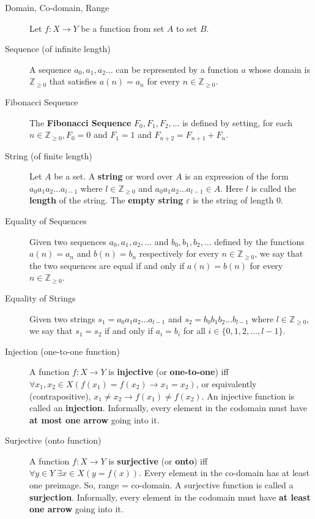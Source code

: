 \documentclass{article}
\begin{document}
\begin{description}
    \item[Domain, Co-domain, Range]Let $f:X\to Y$ be a function from set $A$ to set $B$. 
    \item[Sequence (of infinite length)] A sequence $a_{0}, a_{1}, a_{2} \dots$ can be represented by a function $a$ whose domain is $\mathbb{Z}_{\geq 0}$ that satisfies $a(n)=a_{n}$ for every $n\in \mathbb{Z}_{\geq 0}$.
    \item[Fibonacci Sequence] The \textbf{Fibonacci Sequence} $F_{0}, F_{1}, F_{2}, \dots$ is defined by setting, for each $n \in \mathbb{Z}_{\geq 0}, F_{0}=0$ and $F_{1}=1$ and $F_{n+2}=F_{n+1}+F_{n}$.
    \item[String (of finite length)]Let $A$ be a set. A \textbf{string} or word over $A$ is an expression of the form $a_{0}a_{1}a_{2}\dots a_{l-1}$ where $l\in\mathbb{Z}_{\geq0}$ and $a_{0}a_{1}a_{2}\dots a_{l-1}\in A$. Here $l$ is called the \textbf{length} of the string. The \textbf{empty string} $\varepsilon$ is the string of length 0. 
    \item[Equality of Sequences] Given two sequences $a_{0},a_{1},a_{2},\dots$ and $b_{0},b_{1},b_{2},\dots$ defined by the functions $a(n)=a_{n}$ and $b(n)=b_{n}$ respectively for every $n\in\mathbb{Z}_{\geq0}$, we say that the two sequences are equal if and only if $a(n)=b(n)$ for every $n\in\mathbb{Z}_{\geq0}$.
    \item[Equality of Strings] Given two strings $s_{1}=a_{0}a_{1}a_{2}\dots a_{l-1}$ and $s_{2}=b_{0}b_{1}b_{2}\dots b_{l-1}$ where $l\in\mathbb{Z}_{\geq0}$, we say that $s_{1}=s_{2}$ if and only if $a_{i}=b_{i}$ for all $i\in \{0, 1, 2,\dots,l-1\}$.
    \item[Injection (one-to-one function)]A function $f:X\to Y$ is \textbf{injective} (or \textbf{one-to-one}) iff $\forall x_{1}, x_{2}\in X(f(x_{1})=f(x_{2})\to x_{1}=x_{2})$, or equivalently (contrapositive), $x_{1}\neq x_{2}\to f(x_{1})\neq f(x_{2})$. An injective function is called an \textbf{injection}. Informally, every element in the codomain must have \textbf{at most one arrow} going into it.
    \item[Surjective (onto function)] A function $f:X\to Y$ is \textbf{surjective} (or \textbf{onto}) iff $\forall y\in Y\;\exists x\in X(y=f(x))$. Every element in the co-domain has at least one preimage. So, range = co-domain. A surjective function is called a \textbf{surjection}. Informally, every element in the codomain must have \textbf{at least one arrow} going into it. 

\end{description}
\end{document}
